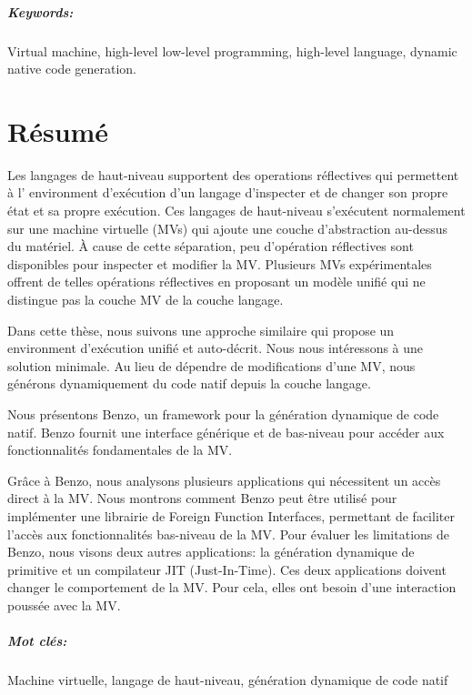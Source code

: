\documentclass[a4paper,11pt,twoside]{include/ThesisStyle}
\begin{document}
\paragraph{Keywords:} Virtual machine, high-level low-level programming, high-level language, dynamic native code generation.

\cleardoublepage
\chapter*{Résumé}
Les langages de haut-niveau supportent des operations réflectives qui permettent à l’ environment d’exécution d’un langage d’inspecter et de changer son propre état et sa propre exécution. Ces langages de haut-niveau s’exécutent normalement sur une machine virtuelle (MVs) qui ajoute une couche d’abstraction au-dessus du matériel. À cause de cette séparation, peu d’opération réflectives sont disponibles pour inspecter et modifier la MV. Plusieurs MVs expérimentales offrent de telles opérations réflectives en proposant un modèle unifié qui ne distingue pas la couche MV de la couche langage. 

Dans cette thèse, nous suivons une approche similaire qui propose un environment d’exécution unifié et auto-décrit. Nous nous intéressons à une solution minimale. Au lieu de dépendre de modifications d’une MV, nous générons dynamiquement du code natif depuis la couche langage. 

Nous présentons Benzo, un framework pour la génération dynamique de code natif. Benzo fournit une interface générique et de bas-niveau pour accéder aux fonctionnalités fondamentales de la MV.

Grâce à Benzo, nous analysons plusieurs applications qui nécessitent un accès direct à la MV. Nous montrons comment Benzo peut être utilisé pour implémenter une librairie de Foreign Function Interfaces, permettant de faciliter l’accès aux fonctionnalités bas-niveau de la MV. Pour évaluer les limitations de Benzo, nous visons deux autres applications: la génération dynamique de primitive et un compilateur JIT (Just-In-Time). Ces deux applications doivent changer le comportement de la MV. Pour cela, elles ont besoin d’une interaction poussée avec la MV.

\paragraph{Mot clés:} Machine virtuelle, langage de haut-niveau, génération dynamique de code natif
 
\end{document}
